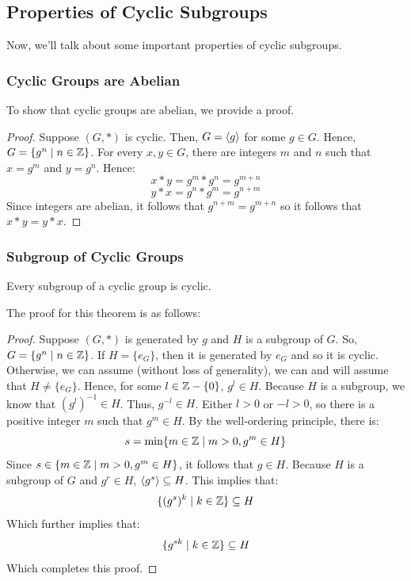\documentclass[letterpaper]{article}
\begin{document}
\subsection{Properties of Cyclic Subgroups}
Now, we'll talk about some important properties of cyclic subgroups.

\subsubsection{Cyclic Groups are Abelian}
To show that cyclic groups are abelian, we provide a proof. 
\begin{mdframed}
    \begin{proof}
        Suppose $(G, *)$ is cyclic. Then, $G = \langle g \rangle$ for some $g \in G$. Hence, $G = \{g^n \mid n \in \mathbb{Z}\}$. For every $x, y \in G$, there are integers $m$ and $n$ such that $x = g^m$ and $y = g^n$. Hence: 
        \[x * y = g^m * g^n = g^{m + n}\]
        \[y * x = g^n * g^m = g^{n + m}\]
        Since integers are abelian, it follows that $g^{n + m} = g^{m + n}$ so it follows that $x * y = y * x$.
    \end{proof}
\end{mdframed}

\subsubsection{Subgroup of Cyclic Groups}
\begin{theorem}{}{}
    Every subgroup of a cyclic group is cyclic.
\end{theorem}
The proof for this theorem is as follows: 
\begin{mdframed}
    \begin{proof}
        Suppose $(G, *)$ is generated by $g$ and $H$ is a subgroup of $G$. So, $G = \{g^n \mid n \in \mathbb{Z}\}$. If $H = \{e_G\}$, then it is generated by $e_G$ and so it is cyclic. Otherwise, we can assume (without loss of generality), we can and will assume that $H \neq \{e_G\}$. Hence, for some $l \in \mathbb{Z} - \{0\}$, $g^l \in H$. Because $H$ is a subgroup, we know that $(g^l)^{-1} \in H$. Thus, $g^{-l} \in H$. Either $l > 0$ or $-l > 0$, so there is a positive integer $m$ such that $g^m \in H$. By the well-ordering principle, there is: 
        \[s = \min\{m \in \mathbb{Z} \mid m > 0, g^m \in H\}\]
        Since $s \in \{m \in \mathbb{Z} \mid m > 0, g^m \in H\}$, it follows that $g \in H$. Because $H$ is a subgroup of $G$ and $g^r \in H$, $\langle g^s \rangle \subseteq H$. This implies that: 
        \[\{(g^s)^k \mid k \in \mathbb{Z}\} \subseteq H\]
        Which further implies that: 
        \[\{g^{sk} \mid k \in \mathbb{Z}\} \subseteq H\]
        Which completes this proof.
    \end{proof}
\end{mdframed}
\end{document}
